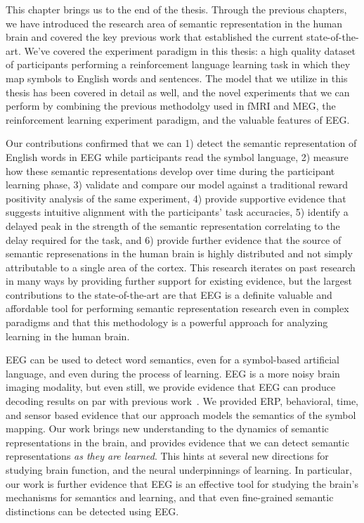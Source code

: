 \label{chapter:conclusion}

This chapter brings us to the end of the thesis. Through the previous chapters, 
we have introduced the research area of semantic representation in the human 
brain and covered the key previous work that established the current 
state-of-the-art. We've covered the experiment paradigm in this thesis: a high 
quality dataset of participants performing a reinforcement language learning 
task in which they map symbols to English words and sentences. The model that 
we utilize in this thesis has been covered in detail as well, and the novel 
experiments that we can perform by combining the previous methodolgy used in 
fMRI and MEG, the reinforcement learning experiment paradigm, and the valuable 
features of EEG.

Our contributions confirmed that we can 1) detect the semantic representation 
of English words in EEG while participants read the symbol language, 2) measure 
how these semantic representations develop over time during the participant 
learning phase, 3) validate and compare our model against a traditional reward 
positivity analysis of the same experiment, 4) provide supportive evidence that 
suggests intuitive alignment with the participants' task accuracies, 5) 
identify a delayed peak in the strength of the semantic representation 
correlating to the delay required for the task, and 6) provide further evidence 
that the source of semantic represenations in the human brain is highly 
distributed and not simply attributable to a single area of the cortex. This 
research iterates on past research in many ways by providing further support 
for existing evidence, but the largest contributions to the state-of-the-art 
are that EEG is a definite valuable and affordable tool for performing semantic 
representation research even in complex paradigms and that this methodology is 
a powerful approach for analyzing learning in the human brain.

EEG can be used to detect word semantics, even for a symbol-based artificial 
language, and even during the process of learning.  EEG is a more noisy brain 
imaging modality, but even still, we provide evidence that EEG can produce 
decoding results on par with previous work~\cite{Mitchell2008}. We provided 
ERP, behavioral, time, and sensor based evidence that our approach models the 
semantics of the symbol mapping. Our work brings new understanding to the 
dynamics of semantic representations in the brain, and provides evidence that 
we can detect semantic representations \emph{as they are learned}.  This hints 
at several new directions for studying brain function, and the neural 
underpinnings of learning.  In particular, our work is further evidence that 
EEG is an effective tool for studying the brain's mechanisms for semantics and 
learning, and that even fine-grained semantic distinctions can be detected 
using EEG.

